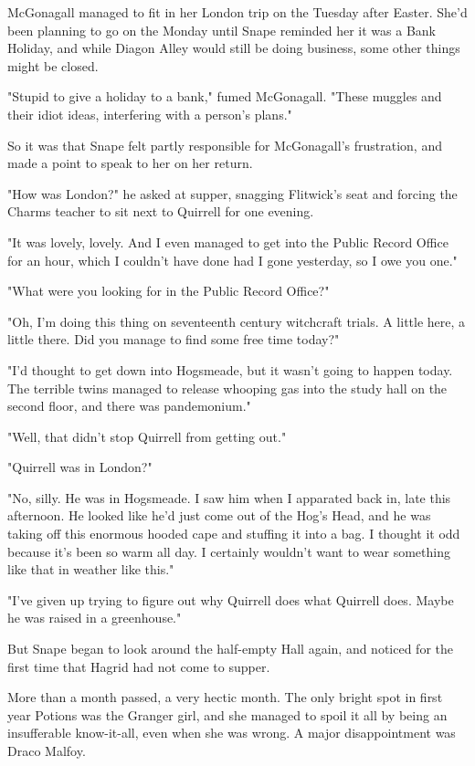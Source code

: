 McGonagall managed to fit in her London trip on the Tuesday after Easter. She'd been planning to go on the Monday until Snape reminded her it was a Bank Holiday, and while Diagon Alley would still be doing business, some other things might be closed.

"Stupid to give a holiday to a bank," fumed McGonagall. "These muggles and their idiot ideas, interfering with a person's plans."

So it was that Snape felt partly responsible for McGonagall's frustration, and made a point to speak to her on her return.

"How was London?" he asked at supper, snagging Flitwick's seat and forcing the Charms teacher to sit next to Quirrell for one evening.

"It was lovely, lovely. And I even managed to get into the Public Record Office for an hour, which I couldn't have done had I gone yesterday, so I owe you one."

"What were you looking for in the Public Record Office?"

"Oh, I'm doing this thing on seventeenth century witchcraft trials. A little here, a little there. Did you manage to find some free time today?"

"I'd thought to get down into Hogsmeade, but it wasn't going to happen today. The terrible twins managed to release whooping gas into the study hall on the second floor, and there was pandemonium."

"Well, that didn't stop Quirrell from getting out."

"Quirrell was in London?"

"No, silly. He was in Hogsmeade. I saw him when I apparated back in, late this afternoon. He looked like he'd just come out of the Hog's Head, and he was taking off this enormous hooded cape and stuffing it into a bag. I thought it odd because it's been so warm all day. I certainly wouldn't want to wear something like that in weather like this."

"I've given up trying to figure out why Quirrell does what Quirrell does. Maybe he was raised in a greenhouse."

But Snape began to look around the half-empty Hall again, and noticed for the first time that Hagrid had not come to supper.

\sbreak

More than a month passed, a very hectic month. The only bright spot in first year Potions was the Granger girl, and she managed to spoil it all by being an insufferable know-it-all, even when she was wrong. A major disappointment was Draco Malfoy.

